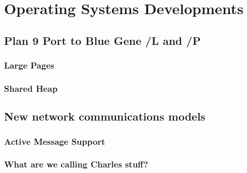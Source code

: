 \chapter{Operating Systems Developments}
\section{Plan 9 Port to Blue Gene /L and /P}
\subsection{Large Pages}
\subsection{Shared Heap}
\section{New network communications models}
\subsection{Active Message Support}
\subsection{What are we calling Charles stuff?}
